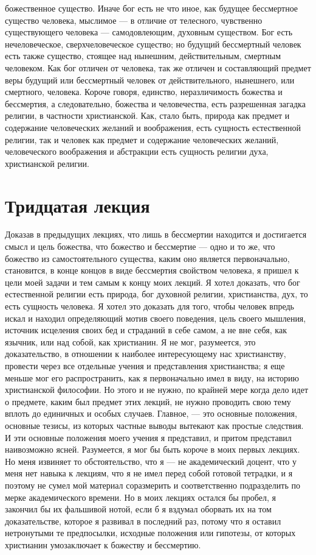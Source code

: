 \documentclass[12pt]{article}
\begin{document}
божественное существо. Иначе бог есть не что иное, как будущее бессмертное существо человека, мыслимое --- в отличие от телесного, чувственно существующего человека --- самодовлеющим, духовным существом. Бог есть нечеловеческое, сверхчеловеческое существо; но будущий бессмертный человек есть также существо, стоящее над нынешним, действительным, смертным человеком. Как бог отличен от человека, так же отличен и составляющий предмет веры будущий или бессмертный человек от действительного, нынешнего, или смертного, человека. Короче говоря, единство, неразличимость божества и бессмертия, а следовательно, божества и человечества, есть разрешенная загадка религии, в частности христианской. Как, стало быть, природа как предмет и содержание человеческих желаний и воображения, есть сущность естественной религии, так и человек как предмет и содержание человеческих желаний, человеческого воображения и абстракции есть сущность религии духа, христианской религии. 

\section*{Тридцатая лекция}

Доказав в предыдущих лекциях, что лишь в бессмертии находится и достигается смысл и цель божества, что божество и бессмертие --- одно и то же, что божество из самостоятельного существа, каким оно является первоначально, становится, в конце концов в виде бессмертия свойством человека, я пришел к цели моей задачи и тем самым к концу моих лекций. Я хотел доказать, что бог естественной религии есть природа, бог духовной религии, христианства, дух, то есть сущность человека. Я хотел это доказать для того, чтобы человек впредь искал и находил определяющий мотив своего поведения, цель своего мышления, источник исцеления своих бед и страданий в себе самом, а не вне себя, как язычник, или над собой, как христианин. Я не мог, разумеется, это доказательство, в отношении к наиболее интересующему нас христианству, провести через все отдельные учения и представления христианства; я еще меньше мог его распространить, как я первоначально имел в виду, на историю христианской философии. Но этого и не нужно, по крайней мере когда дело идет о предмете, каким был предмет этих лекций, не нужно проводить свою тему вплоть до единичных и особых случаев. Главное, --- это основные положения, основные тезисы, из которых частные выводы вытекают как простые следствия. И эти основные положения моего учения я представил, и притом представил наивозможно ясней. Разумеется, я мог бы быть короче в моих первых лекциях. Но меня извиняет то обстоятельство, что я --- не академический доцент, что у меня нет навыка к лекциям, что я не имел перед собой готовой тетрадки, и я поэтому не сумел мой материал соразмерить и соответственно подразделить по мерке академического времени. Но в моих лекциях остался бы пробел, я закончил бы их фальшивой нотой, если б я вздумал оборвать их на том доказательстве, которое я развивал в последний раз, потому что я оставил нетронутыми те предпосылки, исходные положения или гипотезы, от которых христианин умозаключает к божеству и бессмертию. 
\end{document}
